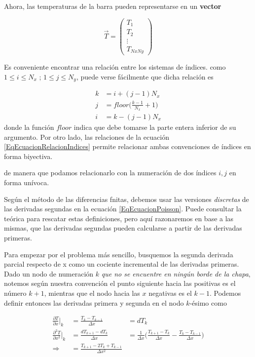 Ahora, las temperaturas de la barra 
pueden representarse en un \textbf{vector} 

\begin{equation} \label{EqEcuacionVectorT}
  \vec{T} = 
  \begin{pmatrix}
    T_1 \\ T_2 \\ \vdots \\ T_{Nx Ny}
  \end{pmatrix}
\end{equation}

Es conveniente encontrar una relación entre los sistemas
de índices. como $1 \leq i \leq N_x $ ; $1 \leq j \leq  N_y$, puede verse
fácilmente que dicha relación es

\begin{equation}\label{EqEcuacionRelacionIndices}
  \begin{aligned}
  k &= i + (j-1)N_x \\
  j &= floor \bigg( \frac{k-1}{N_x} +1  \bigg)\\
  i &= k - (j-1)N_x
  \end{aligned}
\end{equation}
donde la función $floor$ indica que debe tomarse la parte
entera inferior de su argumento. Por otro lado, las relaciones
de la ecuación \ref{EqEcuacionRelacionIndices} permite
relacionar ambas convenciones de índices en forma biyectiva.

de manera que podamos relacionarlo
con la numeración de dos índices $i,j$ en forma unívoca.


Según el método de las diferencias fnitas, debemos
usar las versiones \emph{discretas} de las derivadas
segundas en la ecuación \ref{EqEcuacionPoisson}. 
Puede consultar la teórica para rescatar estas 
definiciones, pero aquí razonaremos en base a las
mismas, que las derivadas segundas pueden calcularse
a partir de las derivadas primeras. 

Para empezar por el problema más sencillo, busquemos la
segunda derivada parcial respecto de x como un cociente 
incremental de las derivadas primeras. 
Dado un nodo de 
numeración $k$ \emph{que no se encuentre en ningún borde
de la chapa}, notemos según nuestra convención el punto
siguiente hacia las positivas es el número $k+1$, mientras
que el nodo hacia las $x$ negativas es el $k-1$. Podemos
definir entonces las derivadas primera y segunda en el
nodo $k$-ésimo como 

\begin{equation}\label{EqEcuacionDerivadaX}
    \begin{aligned}
    \frac{\partial T}{\partial x} \Bigr\rvert _k &=
			   \frac{T_{k}-T_{k-1}}{\Delta x} &= dT_k  \\
    \frac{\partial^2 T}{\partial x^2} \Bigr\rvert _k &=
    \frac{dT_{k+1}- dT_k}{\Delta x}                  &= 
			   \frac{1}{\Delta x} \big(
			   \frac{T_{k+1}-T_k}{\Delta x}
			   -
			   \frac{T_{k}-T_{k-1} }{\Delta x}
			   \big)\\
    \Rightarrow  &= 
    \frac{T_{k+1} - 2T_k +T_{k-1} }{\Delta x ^2}
  \end{aligned}
\end{equation}

